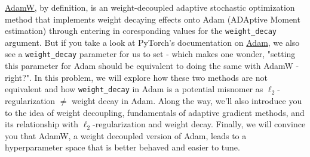 

\href{https://pytorch.org/docs/stable/generated/torch.optim.AdamW.html}{AdamW}, by definition, is an weight-decoupled adaptive stochastic optimization method that implements weight decaying effects onto Adam (ADAptive Moment estimation) through entering in coresponding values for the \texttt{weight\_decay} argument. But if you take a look at PyTorch's documentation on \href{https://pytorch.org/docs/stable/generated/torch.optim.Adam.html}{Adam}, we also see a \texttt{weight\_decay} parameter for us to set - which makes one wonder, "setting this parameter for Adam should be equivalent to doing the same with AdamW - right?". In this problem, we will explore how these two methods are not equivalent and how \texttt{weight\_decay} in Adam is a potential misnomer as $\ell_2$-regularization $\neq$ weight decay in Adam. Along the way, we'll also introduce you to the idea of weight decoupling, fundamentals of adaptive gradient methods, and its relationship with $\ell_2$-regularization and weight decay. Finally, we will convince you that AdamW, a weight decoupled version of Adam, leads to a hyperparameter space that is better behaved and easier to tune.

